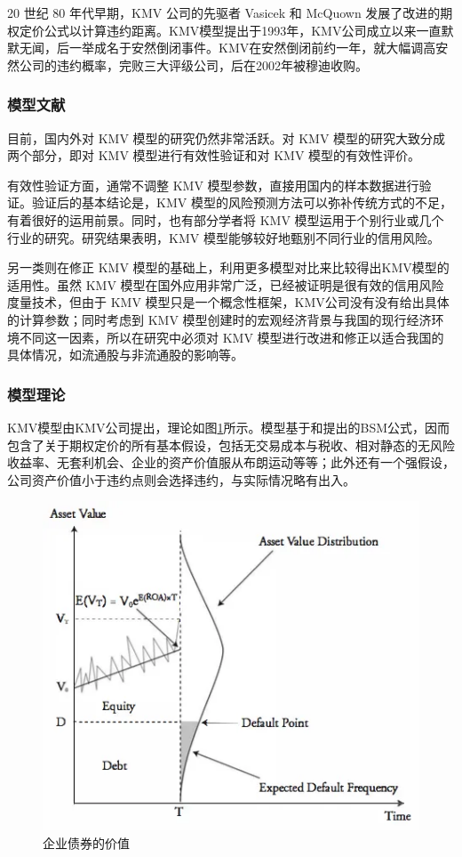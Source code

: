 \documentclass[a4paper,12pt]{ctexart}
\begin{document}
20 世纪 80 年代早期，KMV 公司的先驱者 Vasicek 和 McQuown 发展了改进的期权定价公式以计算违约距离。KMV模型提出于1993年，KMV公司成立以来一直默默无闻，后一举成名于安然倒闭事件。KMV在安然倒闭前约一年，就大幅调高安然公司的违约概率，完败三大评级公司，后在2002年被穆迪收购。

\subsubsection{模型文献}
目前，国内外对 KMV 模型的研究仍然非常活跃。对 KMV 模型的研究大致分成两个部分，即对 KMV 模型进行有效性验证和对 KMV 模型的有效性评价。

有效性验证方面，通常不调整 KMV 模型参数，直接用国内的样本数据进行验证。验证后的基本结论是，KMV 模型的风险预测方法可以弥补传统方式的不足，有着很好的运用前景\cite{李钰2009KMV}。同时，也有部分学者将 KMV 模型运用于个别行业或几个行业的研究。研究结果表明，KMV 模型能够较好地甄别不同行业的信用风险\cite{曾诗鸿2013基于}。

另一类则在修正 KMV 模型的基础上，利用更多模型对比来比较得出KMV模型的适用性\cite{张泽京2007基于}。虽然 KMV 模型在国外应用非常广泛，已经被证明是很有效的信用风险度量技术，但由于 KMV 模型只是一个概念性框架，KMV公司没有没有给出具体的计算参数；同时考虑到 KMV 模型创建时的宏观经济背景与我国的现行经济环境不同这一因素，所以在研究中必须对 KMV 模型进行改进和修正以适合我国的具体情况\cite{都红雯2004我国对}，如流通股与非流通股的影响等。

\subsubsection{模型理论}

KMV模型由KMV公司提出，理论如图\ref{fig:bsm}所示。模型基于\citet{black1973pricing}和\citet{merton1974pricing}提出的BSM公式，因而包含了关于期权定价的所有基本假设，包括无交易成本与税收、相对静态的无风险收益率、无套利机会、企业的资产价值服从布朗运动等等；此外还有一个强假设，公司资产价值小于违约点则会选择违约，与实际情况略有出入。

\begin{figure}[ht]
    \centering
    \includegraphics[width=0.8\linewidth]{img/KMV.png}
    \caption{企业债券的价值}\label{fig:bsm}
\end{figure}
\end{document}

